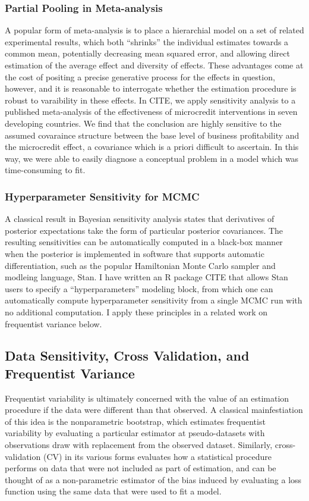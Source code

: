 \subsubsection*{Partial Pooling in Meta-analysis}

A popular form of meta-analysis is to place a hierarchial model on a set of
related experimental results, which both ``shrinks'' the individual estimates
towards a common mean, potentially decreasing mean squared error, and
allowing direct estimation of the average effect and diversity of effects.
These advantages come at the cost of positing a precise generative
process for the effects in question, however, and it is reasonable to
interrogate whether the estimation procedure is robust to varaibility
in these effects.  In CITE, we apply sensitivity analysis to a published
meta-analysis of the effectiveness of microcredit interventions in seven
developing countries.  We find that the conclusion are highly sensitive
to the assumed covaraince structure between the base level of business
profitability and the microcredit effect, a covariance which is a priori
difficult to ascertain.  In this way, we were able to easily diagnose
a conceptual problem in a model which was time-consuming to fit.


\subsubsection*{Hyperparameter Sensitivity for MCMC}

A classical result in Bayesian sensitivity analysis states that derivatives
of posterior expectations take the form of particular posterior covariances.
The resulting sensitivities can be automatically computed in a black-box
manner when the posterior is implemented in software that supports
automatic differentiation, such as the popular Hamiltonian Monte Carlo
sampler and modleing language, Stan.  I have written an R package CITE
that allows Stan users to specify a ``hyperparameters'' modeling block,
from which one can automatically compute hyperparameter sensitivity from
a single MCMC run with no additional computation.  I apply these principles
in a related work on frequentist variance below.


\subsection*{Data Sensitivity, Cross Validation, and Frequentist Variance}

Frequentist variability is ultimately concerned with the value of an
estimation procedure if the data were different than that observed.  A classical
mainfestiation of this idea is the nonparametric bootstrap, which estimates
frequentist variability by evaluating a particular estimator at pseudo-datasets
with observations draw with replacement from the observed dataset.  Similarly,
cross-validation (CV) in its various forms evaluates how a statistical procedure
performs on data that were not included as part of estimation, and can be
thought of as a non-parametric estimator of the bias induced by evaluating
a loss function using the same data that were used to fit a model.

